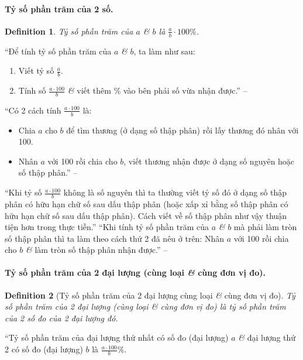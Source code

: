 \documentclass{article}
\numberwithin{equation}{section}
\newtheorem{definition}{Definition}[section]
\begin{document}
\paragraph{Tỷ số phần trăm của 2 số.}
\begin{definition}
	\emph{Tỷ số phần trăm} của $a$ \textit{\&} $b$ là $\frac{a}{b}\cdot 100\%$.
\end{definition}
``Để tính tỷ số phần trăm của $a$ \textit{\&} $b$, ta làm như sau:
\begin{enumerate}
	\item Viết tỷ số $\frac{a}{b}$.
	\item Tính số $\frac{a\cdot100}{b}$ \textit{\&} viết thêm $\%$ vào bên phải số vừa nhận được.'' -- \cite[p. 63]{Thai_Anh_Dat_Ha_Loan_Nam_Quang_Toan_6_tap_2}
\end{enumerate}
``Có 2 cách tính $\frac{a\cdot 100}{b}$ là:
\begin{itemize}
	\item Chia $a$ cho $b$ để tìm thương (ở dạng số thập phân) rồi lấy thương đó nhân với 100.
	\item Nhân $a$ với 100 rồi chia cho $b$, viết thương nhận được ở dạng số nguyên hoặc số thập phân.'' -- \cite[p. 63]{Thai_Anh_Dat_Ha_Loan_Nam_Quang_Toan_6_tap_2}
\end{itemize}
``Khi tỷ số $\frac{a\cdot 100}{b}$ không là số nguyên thì ta thường viết tỷ số đó ở dạng số thập phân có hữu hạn chữ số sau dấu thập phân (hoặc xấp xỉ bằng số thập phân có hữu hạn chữ số sau dấu thập phân). Cách viết về số thập phân như vậy thuận tiện hơn trong thực tiễn.'' ``Khi tính tỷ số phần trăm của $a$ \textit{\&} $b$ mà phải làm tròn số thập phân thì ta làm theo cách thứ 2 đã nêu ở trên: Nhân $a$ với 100 rồi chia cho $b$ \textit{\&} làm tròn số thập phân nhận được.'' -- \cite[p. 64]{Thai_Anh_Dat_Ha_Loan_Nam_Quang_Toan_6_tap_2}

\paragraph{Tỷ số phần trăm của 2 đại lượng (cùng loại \textit{\&} cùng đơn vị đo).}
\begin{definition}[Tỷ số phần trăm của 2 đại lượng cùng loại \textit{\&} cùng đơn vị đo]
	 \emph{Tỷ số phần trăm của 2 đại lượng (cùng loại \textit{\&} cùng đơn vị đo)} là tỷ số phần trăm của 2 số đo của 2 đại lượng đó.
\end{definition}
``Tỷ số phần trăm của đại lượng thứ nhất có số đo (đại lượng) $a$ \textit{\&} đại lượng thứ 2 có số đo (đại lượng) $b$ là $\frac{a\cdot100}{b}\%$.
\end{document}
